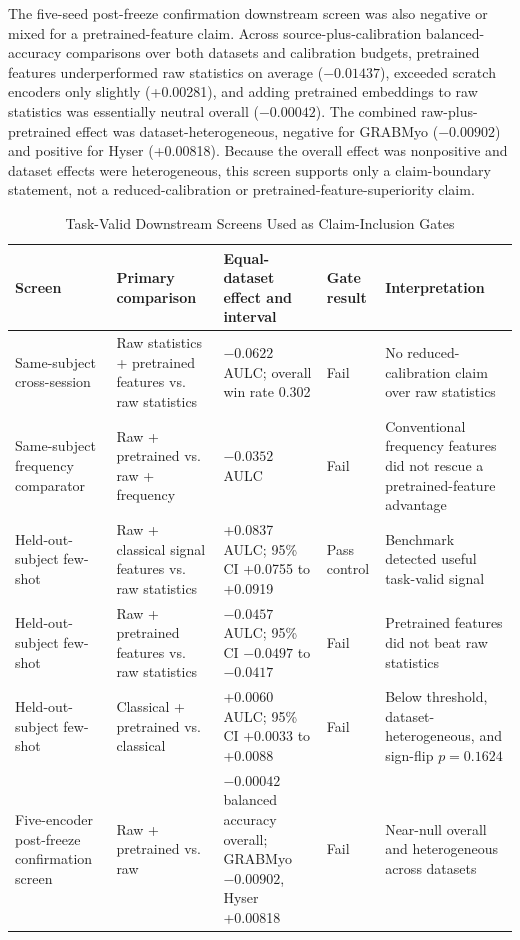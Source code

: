 \documentclass[journal]{IEEEtran}
\begin{document}
The five-seed post-freeze confirmation downstream screen was also negative or mixed for a pretrained-feature claim. Across source-plus-calibration balanced-accuracy comparisons over both datasets and calibration budgets, pretrained features underperformed raw statistics on average ($-0.01437$), exceeded scratch encoders only slightly (+0.00281), and adding pretrained embeddings to raw statistics was essentially neutral overall ($-0.00042$). The combined raw-plus-pretrained effect was dataset-heterogeneous, negative for GRABMyo ($-0.00902$) and positive for Hyser (+0.00818). Because the overall effect was nonpositive and dataset effects were heterogeneous, this screen supports only a claim-boundary statement, not a reduced-calibration or pretrained-feature-superiority claim.

\begin{table}[t]
\caption{Task-Valid Downstream Screens Used as Claim-Inclusion Gates}
\label{tab:downstreamscreens}
\centering
\footnotesize
\begin{tabularx}{\textwidth}{@{}p{2.5cm}p{3.25cm}p{4.2cm}p{2.1cm}Y@{}}
\toprule
Screen & Primary comparison & Equal-dataset effect and interval & Gate result & Interpretation \\
\midrule
Same-subject cross-session & Raw statistics + pretrained features vs. raw statistics & $-0.0622$ AULC; overall win rate 0.302 & Fail & No reduced-calibration claim over raw statistics \\
Same-subject frequency comparator & Raw + pretrained vs. raw + frequency & $-0.0352$ AULC & Fail & Conventional frequency features did not rescue a pretrained-feature advantage \\
Held-out-subject few-shot & Raw + classical signal features vs. raw statistics & +0.0837 AULC; 95\% CI +0.0755 to +0.0919 & Pass control & Benchmark detected useful task-valid signal \\
Held-out-subject few-shot & Raw + pretrained features vs. raw statistics & $-0.0457$ AULC; 95\% CI $-0.0497$ to $-0.0417$ & Fail & Pretrained features did not beat raw statistics \\
Held-out-subject few-shot & Classical + pretrained vs. classical & +0.0060 AULC; 95\% CI +0.0033 to +0.0088 & Fail & Below threshold, dataset-heterogeneous, and sign-flip $p=0.1624$ \\
Five-encoder post-freeze confirmation screen & Raw + pretrained vs. raw & $-0.00042$ balanced accuracy overall; GRABMyo $-0.00902$, Hyser +0.00818 & Fail & Near-null overall and heterogeneous across datasets \\
\bottomrule
\end{tabularx}
\end{table}
\end{document}
